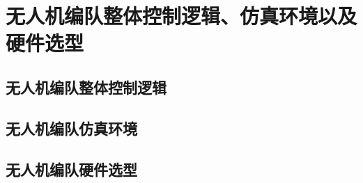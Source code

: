 \chapter{无人机编队整体控制逻辑、仿真环境以及硬件选型}
\label{chap:hardware}
\section{无人机编队整体控制逻辑}
\section{无人机编队仿真环境}
\section{无人机编队硬件选型}